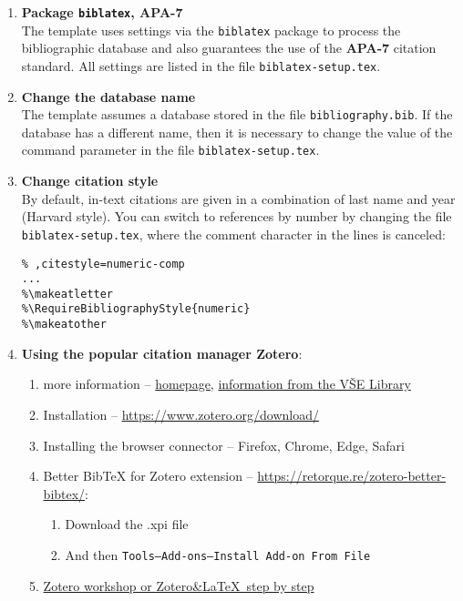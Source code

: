 \begin{enumerate}

\item \textbf{Package \verb'biblatex', APA-7}\\
The template uses settings via the \verb|biblatex| package to process the 
bibliographic database and also guarantees the use of the \textbf{APA-7} 
citation standard. All settings are listed in the file \texttt{biblatex-setup.tex}.

\item\textbf{Change the database name}\\
The template assumes a database stored in the file \texttt{bibliography.bib}. If 
the database has a different name, then it is necessary to change the value of 
the command parameter \verb'' in the file \texttt{biblatex-setup.tex}.

\item\textbf{Change citation style}\\
By default, in-text citations are given in a combination of last name and year 
(Harvard style). You can switch to references by number by changing the 
file \nolinkurl{biblatex-setup.tex}, where the comment character in the lines is 
canceled:
\begin{verbatim}
% ,citestyle=numeric-comp
...
%\makeatletter
%\RequireBibliographyStyle{numeric}
%\makeatother
\end{verbatim}

\item \textbf{Using the popular citation manager Zotero}:
\begin{enumerate}
\item more information -- \href{https://www.zotero.org/}{homepage}, \href{https://knihovna.vse.cz/citace/nastroje/zotero/}{information from the VŠE Library}
\item Installation -- \url{https://www.zotero.org/download/}
\item Installing the browser connector -- Firefox, Chrome, Edge, Safari
\item Better BibTeX for Zotero extension -- \url{https://retorque.re/zotero-better-bibtex/}:
 \begin{enumerate}
 \item Download the .xpi file
 \item And then \texttt{Tools--Add-ons--Install Add-on From File}
 \end{enumerate}
\item \href{https://formadoct.doctorat-bretagneloire.fr/zotero_workshop/latex}{Zotero workshop or Zotero\&{}\LaTeX\ step by step}
\end{enumerate}
\end{enumerate}


